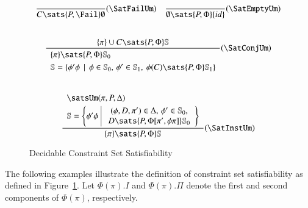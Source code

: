 \documentclass[review]{elsarticle}
\begin{document}
\begin{figure}
  \[ \begin{array}{cc}
  	\displaystyle\frac{}{C \sats {P,\Fail} \emptyset} (\SatFailUm)
  		{} &
  	\displaystyle\frac{}{\emptyset \sats {P,\Phi} \{ id\}} (\SatEmptyUm)\\ \\ \\
	\multicolumn{2}{c}{
    \displaystyle\frac
    	{\{\pi\} \cup C \sats {P,\Phi} \mathbb{S}}
    	{\begin{array}{l}
	     \{ \pi \} \sats {P,\Phi} \mathbb{S}_0 \\[.1cm]
	     \mathbb{S} = \{ \phi' \phi \,\mid\, \phi \in \mathbb{S}_0,\, \phi' \in \mathbb{S}_1,\:
                             \phi(C) \sats {P,\Phi} \mathbb{S}_1 \}
	   \end{array}} (\SatConjUm)
	}\\ \\ \\
	\multicolumn{2}{c}{
	\displaystyle\frac
	{\begin{array}{l}
	     \satsUm(\pi, P,\Delta) \\[.1cm]
	     \mathbb{S} = \left\{  \phi'\phi \,\,
	     				\begin{array}{|c}
	     					\,\,(\phi,D,\pi') \in \Delta,\, \phi' \in \mathbb{S}_0,\\
	     					\,\,D  \sats {P,\Phi[\pi',\phi\pi]} \mathbb{S}_0
	     				\end{array}\right\}
	 \end{array}}
	{\{\pi\} \sats {P,\Phi} \mathbb{S}} (\SatInstUm) }
      \end{array} \]
\caption{Decidable Constraint Set Satisfiability}
\label{fig-tsat}
\end{figure}

The following examples illustrate the definition of constraint set
satisfiability as defined in Figure~\ref{fig-tsat}.
Let $\Phi(\pi).I$ and $\Phi(\pi).\Pi$ denote the first and second
components of $\Phi(\pi)$, respectively.
\end{document}
